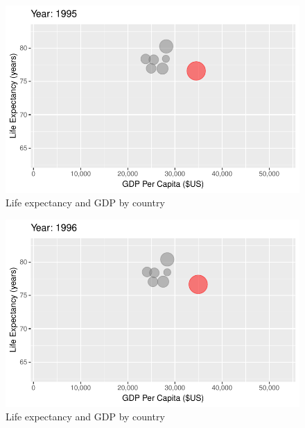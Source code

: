 \documentclass[
  letterpaper,
  DIV=11,
  numbers=noendperiod]{scrreport}
\theoremstyle{definition}
\theoremstyle{remark}
\begin{document}
\begin{figure}

{\centering \includegraphics{index_files/figure-pdf/fig-anim-country-79.pdf}

}

\caption{\label{fig-anim-country-79}Life expectancy and GDP by country}

\end{figure}

\begin{figure}

{\centering \includegraphics{index_files/figure-pdf/fig-anim-country-80.pdf}

}

\caption{\label{fig-anim-country-80}Life expectancy and GDP by country}

\end{figure}
\end{document}
